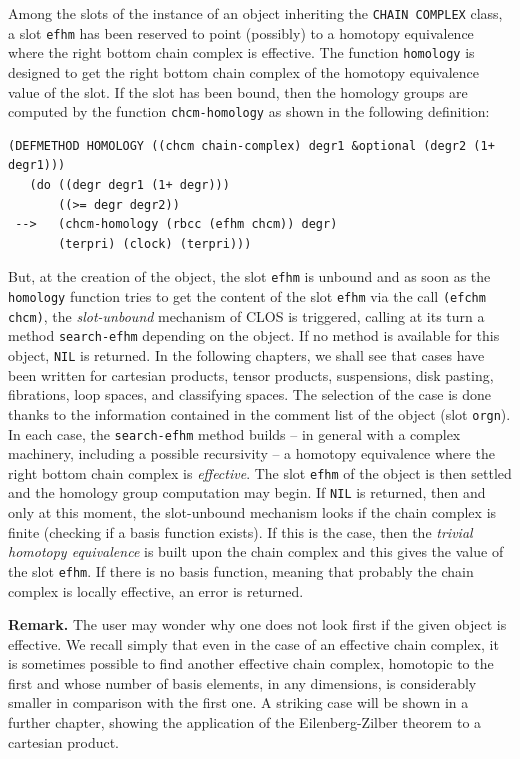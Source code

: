 Among the slots of the instance of an  object 
inheriting the {\tt CHAIN COMPLEX} class, a slot {\tt efhm}
has been reserved to point (possibly) to a homotopy e\-qui\-va\-len\-ce where the right bottom
chain complex is effective. The function {\tt homology} is designed to get
the right bottom chain complex of the homotopy equivalence value of the slot. If the
slot has been bound, then the homology groups are computed by the function {\tt chcm-homology}
as shown in the following de\-fi\-ni\-ti\-on:
{\footnotesize\begin{verbatim}
(DEFMETHOD HOMOLOGY ((chcm chain-complex) degr1 &optional (degr2 (1+ degr1)))
   (do ((degr degr1 (1+ degr)))
       ((>= degr degr2))
 -->   (chcm-homology (rbcc (efhm chcm)) degr)
       (terpri) (clock) (terpri)))
\end{verbatim}}
But, at the creation of the object, the slot {\tt efhm} is  unbound and as soon as the {\tt homology}
function tries to get the content of the slot {\tt efhm} via the call {\tt (efchm chcm)}, the
{\em slot-unbound} mechanism of CLOS is triggered, calling at its turn a method
{\tt search-efhm} depending on the object. If no method is available for this object,
{\tt NIL} is returned. In the following chapters, we shall see that cases have been
written for cartesian products, tensor products, suspensions, disk pasting, fibrations, 
loop spaces, and classifying spaces. The selection of the case is done thanks to the information 
contained in the comment list of the object (slot {\tt orgn}).
In each case,  the {\tt search-efhm} method builds -- in general with a complex machinery, including a possible
recursivity --
a homotopy equivalence where the right bottom
chain complex is {\em effective}. The slot {\tt efhm} of the object is then settled and the homology group
computation may begin. If {\tt NIL} is returned, then  and only at this moment, the slot-unbound
mechanism looks if the chain complex is finite (checking if a basis function exists). If this is the case, then
the {\em trivial homotopy equivalence} is built upon the chain complex and this gives the value of the slot
{\tt efhm}. If there is no basis function,  meaning that probably the chain complex is locally
effective, an error is returned.
\par
{\bf Remark.} The user may wonder why one does not  look first if the given object is effective.
We recall simply that even in the case of an effective chain complex, it is sometimes
possible to find another effective chain complex, homotopic to the first and whose 
number of basis elements, in any dimensions, is considerably smaller in comparison with the first one.
A striking case will be shown in a further chapter, showing the application of the
Eilenberg-Zilber theorem to a cartesian product.

